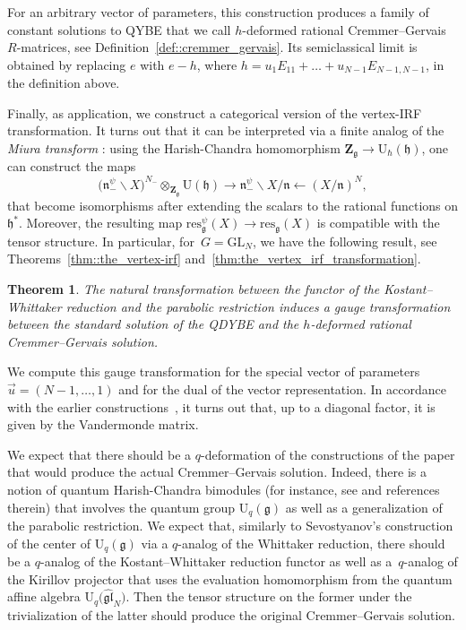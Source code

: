\documentclass[10pt,a4paper]{amsart}
\numberwithin{equation}{section}
\newtheorem{thmx}{Theorem}
\newcommand{\U}{\mathrm{U}_{\hbar}}
\newcommand{\Z}{\mathbf{Z}}
\newcommand{\GL}{\mathrm{GL}}
\newcommand{\g}{\mathfrak{g}}
\newcommand{\h}{\mathfrak{h}}
\newcommand{\n}{\mathfrak{n}}
\newcommand{\res}{\mathrm{res}}
\newcommand{\gl}{\mathfrak{gl}}
\begin{document}
	For an arbitrary vector of parameters, this construction produces a family of constant solutions to QYBE that we call $h$-deformed rational Cremmer--Gervais $R$-matrices, see Definition~\ref{def::cremmer_gervais}. Its semiclassical limit is obtained by replacing $e$ with $e-h$, where $h = u_1 E_{11} + \dots + u_{N-1} E_{N-1,N-1}$, in the definition above.
	
	Finally, as application, we construct a categorical version of the vertex-IRF transformation. It turns out that it can be interpreted via a finite analog of the \emph{Miura transform} \cite{GinzburgKazhdan}: using the Harish-Chandra homomorphism $\Z_{\g} \rightarrow \U(\h)$, one can construct the maps
	\[
	\bigl(\n_-^{\psi} \backslash X\bigr)^{N_-} \otimes_{\Z_{\g}} \mathrm{U}(\h) \rightarrow \n_-^{\psi} \backslash X /\n \leftarrow (X/\n)^{N},
	\]
	that become isomorphisms after extending the scalars to the rational functions on $\h^*$. Moreover, the resulting map $\res^{\psi}_{\g} (X) \rightarrow \res_{\g}(X)$ is compatible with the tensor structure. In particular, for~${G = \GL_N}$, we have the following result, see Theorems~\ref{thm::the_vertex-irf} and~\ref{thm:the_vertex_irf_transformation}.
	
	\begin{thmx}
		The natural transformation between the functor of the Kostant--Whittaker reduction and the parabolic restriction induces a gauge transformation between the standard solution of the QDYBE and the $h$-deformed rational Cremmer--Gervais solution.
	\end{thmx}
	
	We compute this gauge transformation for the special vector of parameters $\vec{u} = (N-1,\dots,1)$ and for the dual of the vector representation. In accordance with the
	earlier constructions~\cite{BalogDabrowskiFeher,BuffenoirRocheTerras,CremmerGervais}, it turns out that, up to a diagonal factor, it is given by the Vandermonde matrix.
	
	We expect that there should be a $q$-deformation of the constructions of the paper that would produce the actual Cremmer--Gervais solution. Indeed, there is a notion of quantum Harish-Chandra bimodules (for instance, see \cite[Section 2.5]{KalmykovSafronov} and references therein) that involves the quantum group $\mathrm{U}_q(\g)$ as well as a generalization of the parabolic restriction. We expect that, similarly to Sevostyanov's construction \cite{SevostyanovWhittakerModules} of the center of $\mathrm{U}_q(\g)$ via a $q$-analog of the Whittaker reduction, there should be a $q$-analog of the Kostant--Whittaker reduction functor as well as a~$q$-analog of the Kirillov projector that uses the evaluation homomorphism from the quantum affine algebra $\mathrm{U}_q\bigl(\hat{\gl}_N\bigr)$. Then the tensor structure on the former under the trivialization of the latter should produce the original Cremmer--Gervais solution.
	
\end{document}
